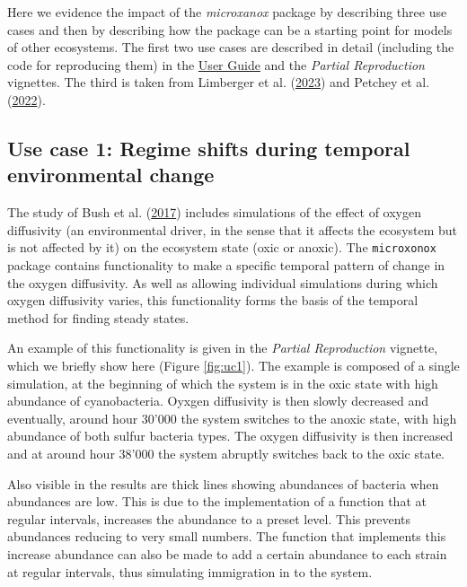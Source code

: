 \documentclass[
]{article}
\begin{document}
Here we evidence the impact of the \emph{microxanox} package by describing three use cases and then by describing how the package can be a starting point for models of other ecosystems. The first two use cases are described in detail (including the code for reproducing them) in the \href{https://uzh-peg.r-universe.dev/articles/microxanox/User-guide.html}{User Guide} and the \emph{Partial Reproduction} vignettes. The third is taken from Limberger et al. (\protect\hyperlink{ref-Limberger2022}{2023}) and Petchey et al. (\protect\hyperlink{ref-Petchey2022}{2022}).

\hypertarget{use-case-1-regime-shifts-during-temporal-environmental-change}{%
\subsection{Use case 1: Regime shifts during temporal environmental change}\label{use-case-1-regime-shifts-during-temporal-environmental-change}}

The study of Bush et al. (\protect\hyperlink{ref-Bush2017}{2017}) includes simulations of the effect of oxygen diffusivity (an environmental driver, in the sense that it affects the ecosystem but is not affected by it) on the ecosystem state (oxic or anoxic). The \texttt{microxonox} package contains functionality to make a specific temporal pattern of change in the oxygen diffusivity. As well as allowing individual simulations during which oxygen diffusivity varies, this functionality forms the basis of the temporal method for finding steady states.

An example of this functionality is given in the \emph{Partial Reproduction} vignette, which we briefly show here (Figure \ref{fig:uc1}). The example is composed of a single simulation, at the beginning of which the system is in the oxic state with high abundance of cyanobacteria. Oyxgen diffusivity is then slowly decreased and eventually, around hour 30'000 the system switches to the anoxic state, with high abundance of both sulfur bacteria types. The oxygen diffusivity is then increased and at around hour 38'000 the system abruptly switches back to the oxic state.

Also visible in the results are thick lines showing abundances of bacteria when abundances are low. This is due to the implementation of a function that at regular intervals, increases the abundance to a preset level. This prevents abundances reducing to very small numbers. The function that implements this increase abundance can also be made to add a certain abundance to each strain at regular intervals, thus simulating immigration in to the system.
\end{document}
